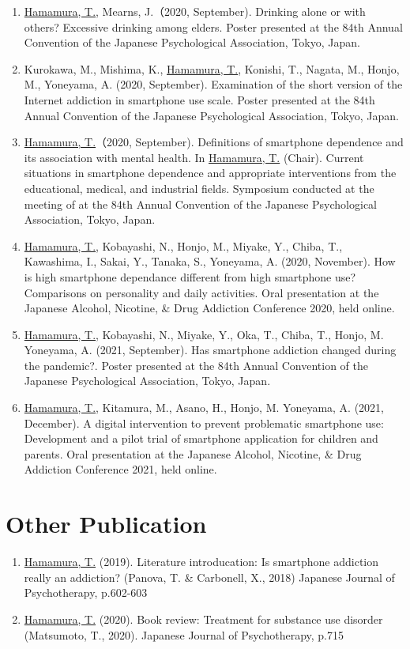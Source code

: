 \documentclass{article}
\begin{document}
\begin{enumerate}
	\item \underline{Hamamura, T.}, Mearns, J.（2020, September). Drinking alone or with others? Excessive drinking among elders. Poster presented at the 84th Annual Convention of the Japanese Psychological Association, Tokyo, Japan.
	\item Kurokawa, M., Mishima, K., \underline{Hamamura, T.}, Konishi, T., Nagata, M., Honjo, M., Yoneyama, A. (2020, September). Examination of the short version of the Internet addiction in smartphone use scale. Poster presented at the 84th Annual Convention of the Japanese Psychological Association, Tokyo, Japan.
	\item \underline{Hamamura, T.}（2020, September).  Definitions of smartphone dependence and its association with mental health.	In \underline{Hamamura, T.} (Chair). Current situations in smartphone dependence and appropriate interventions from the educational, medical, and industrial fields. Symposium conducted at the meeting of at the 84th Annual Convention of the Japanese Psychological Association, Tokyo, Japan.
	\item \underline{Hamamura, T.}, Kobayashi, N., Honjo, M., Miyake, Y., Chiba, T., Kawashima, I., Sakai, Y., Tanaka, S., Yoneyama, A. (2020, November). How is high smartphone dependance different from high smartphone use? Comparisons on personality and daily activities. Oral presentation at the Japanese Alcohol, Nicotine, \& Drug Addiction Conference 2020, held online.
	\item \underline{Hamamura, T.}, Kobayashi, N., Miyake, Y., Oka, T., Chiba, T., Honjo, M. Yoneyama, A. (2021, September). Has smartphone addiction changed during the pandemic?. Poster presented at the 84th Annual Convention of the Japanese Psychological Association, Tokyo, Japan.
	\item \underline{Hamamura, T.}, Kitamura, M., Asano, H., Honjo, M. Yoneyama, A. (2021, December). A digital intervention to prevent problematic smartphone use: Development and a pilot trial of smartphone application for children and parents. Oral presentation at the Japanese Alcohol, Nicotine, \& Drug Addiction Conference 2021, held online.
	\end{enumerate}

\section{Other Publication}
	\begin{enumerate}
		\item \underline{Hamamura, T.} (2019). Literature introducation: Is smartphone addiction really an addiction? (Panova, T. \& Carbonell, X., 2018) Japanese Journal of Psychotherapy, p.602-603
		\item \underline{Hamamura, T.} (2020). Book review: Treatment for substance use disorder (Matsumoto, T., 2020). Japanese Journal of Psychotherapy, p.715
	\end{enumerate}
\end{document}
